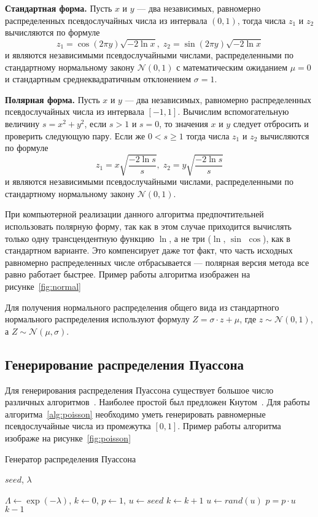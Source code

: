 \documentclass[%
floatfix,
showkeys,
nofootinbib, %
superscriptaddress, %
]{revtex4-1}
\begin{document}
\textbf{Стандартная форма.} Пусть $x$ и $y$ --- два независимых, равномерно распределенных псевдослучайных числа из интервала $(0, 1)$, тогда числа $z_1$ и $z_2$ вычисляются по формуле
\[
  z_{1} = \cos(2\pi y)\sqrt{-2\ln{x}},\; z_{2} = \sin(2\pi y)\sqrt{-2\ln{x}}
\]
и являются независимыми псевдослучайными числами, распределенными по
стандартному нормальному закону $\mathcal{N}(0,1)$ с математическим
ожиданием $\mu = 0$ и стандартным среднеквадратичным отклонением
$\sigma = 1$.

\textbf{Полярная форма.} Пусть $x$ и $y$ --- два независимых,
равномерно распределенных псевдослучайных числа из интервала
$[-1, 1]$. Вычислим вспомогательную величину $s = x^2 + y^2$, если
$s>1$ и $s=0$, то значения $x$ и $y$ следует отбросить и проверить
следующую пару. Если же $0 < s \geqslant 1$ тогда числа $z_1$ и $z_2$
вычисляются по формуле
\[
  z_1 = x\sqrt{\dfrac{-2\ln{s}}{s}},\; z_2 = y \sqrt{\dfrac{-2\ln{s}}{s}}
\]
и являются независимыми псевдослучайными числами, распределенными по
стандартному нормальному закону $\mathcal{N}(0,1)$.

При компьютерной реализации данного алгоритма предпочтительней
использовать полярную форму, так как в этом случае приходится
вычислять только одну трансцендентную функцию $\ln$, а не три ($\ln$,
$\sin$ $\cos$), как в стандартном варианте. Это компенсирует даже тот
факт, что часть исходных равномерно распределенных числе отбрасывается
--- полярная версия метода все равно работает быстрее. Пример работы
алгоритма изображен на рисунке~\ref{fig:normal}

Для получения нормального распределения общего вида из стандартного нормального распределения используют формулу $Z = \sigma \cdot z + \mu$, где $z \sim \mathcal{N}(0,1)$, а $Z \sim \mathcal{N}(\mu,\sigma)$.


\subsection{Генерирование распределения Пуассона}

Для генерирования распределения Пуассона существует большое число
различных алгоритмов~\cite{L_Devroye, L_Ahrens:1974,
  L_Ahrens:1982}. Наиболее простой был предложен
Кнутом~\cite{L_DKnuth:2004:ru}. Для работы
алгоритма~\ref{alg:poisson} необходимо уметь генерировать равномерные
псевдослучайные числа из промежутка $[0,1]$. Пример работы алгоритма
изображе на рисунке~\ref{fig:poisson}
\begin{algorithm}[H]
  \caption{Генератор распределения Пуассона}\label{alg:poisson}
  \begin{algorithmic}
                \Require $seed$, $\lambda$
    
                \State $\Lambda \leftarrow \exp(-\lambda)$, $k \leftarrow 0$, $p \leftarrow 1$, $u \leftarrow seed$
    \Repeat
      \State $k \leftarrow k + 1$
                        \State $u \leftarrow rand(u)$ 
                        \State $p = p \cdot u$
    \State \Return $k - 1$
  \end{algorithmic}
\end{algorithm}
\end{document}

